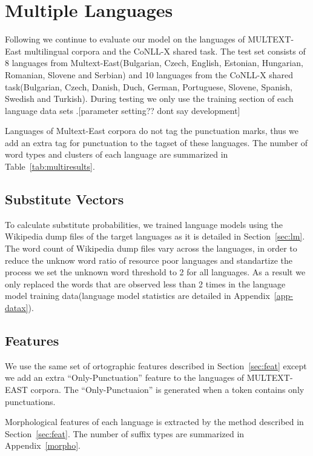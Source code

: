 \section{Multiple Languages}
 

Following \cite{christodoulopoulos-goldwater-steedman:2011:EMNLP} we
continue to evaluate our model on the languages of
MULTEXT-East\cite{Multext} multilingual corpora and the
CoNLL-X\cite{conll} shared task.  The test set consists of 8 languages
from Multext-East(Bulgarian, Czech, English, Estonian, Hungarian,
Romanian, Slovene and Serbian) and 10 languages from the CoNLL-X
shared task(Bulgarian, Czech, Danish, Duch, German, Portuguese,
Slovene, Spanish, Swedish and Turkish).  During testing we only use
the training section of each language data sets
\cite{Lee:2010:STU:1870658.1870741}.[parameter setting?? dont say
  development]

Languages of Multext-East corpora do not tag the punctuation marks,
thus we add an extra tag for punctuation to the tagset of these
languages.  The number of word types and clusters of each language are
summarized in Table~\ref{tab:multiresults}.

\subsection{Substitute Vectors}
To calculate substitute probabilities, we trained language models
using the Wikipedia dump files of the target languages\cite{wikipedia}
as it is detailed in Section~\ref{sec:lm}.  The word count of
Wikipedia dump files vary across the languages, in order to reduce the
unknow word ratio of resource poor languages and standartize the
process we set the unknown word threshold to 2 for all languages.  As
a result we only replaced the words that are observed less than 2
times in the language model training data(language model statistics
are detailed in Appendix~\ref{app-datax}).

\subsection{Features}
We use the same set of ortographic features described in
Section~\ref{sec:feat} except we add an extra ``Only-Punctuation''
feature to the languages of MULTEXT-EAST corpora.  The
``Only-Punctuaion'' is generated when a token contains only
punctuations.  

Morphological features of each language is extracted by the method
described in Section~\ref{sec:feat}.  The number of suffix types are
summarized in Appendix~\ref{morpho}.


